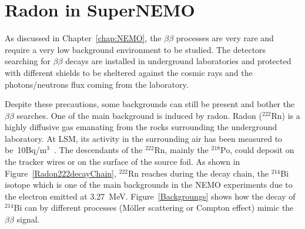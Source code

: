\documentclass[main.tex]{subfiles}
\begin{document}
\chapter{Radon in SuperNEMO}\label{chap:Radon}







\NI As discussed in Chapter~\ref{chap:NEMO}, the $\beta\beta$ processes are very rare and require a very low background environment to be studied. The detectors searching for $\beta\beta$ decays are installed in underground laboratories and protected with different shields to be sheltered against the cosmic rays and the photons/neutrons flux coming from the laboratory.


\bigskip


\NI Despite these precautions, some backgrounds can still be present and bother the $\beta\beta$ searches. One of the main background is induced by radon. Radon ($^{\text{222}}$Rn) is a highly diffusive gas emanating from the rocks surrounding the underground laboratory. At LSM, its activity in the surrounding air has been measured to be~10Bq/m$^\text{3}$~\cite{RadonLSM}. The descendants of the $^{\text{222}}$Rn, mainly the $^{\text{218}}$Po, could deposit on the tracker wires or on the surface of the source foil. As shown in Figure~\ref{Radon222decayChain}, $^{\text{222}}$Rn reaches during the decay chain, the $^{\text{214}}$Bi isotope which is one of the main backgrounds in the NEMO experiments due to the electron emitted at 3.27~MeV. Figure~\ref{Backgroungs} shows how the decay of $^{\text{214}}$Bi can by different processes (Möller scattering or Compton effect) mimic the $\beta\beta$ signal. 
\end{document}
